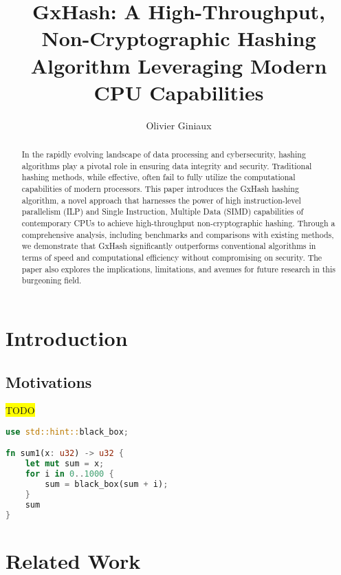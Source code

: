 \documentclass[11pt]{article}
\title{GxHash: A High-Throughput, Non-Cryptographic Hashing Algorithm Leveraging Modern CPU Capabilities}
\author{Olivier Giniaux}
\date{}
\begin{document}
\maketitle

\begin{abstract}

In the rapidly evolving landscape of data processing and cybersecurity, hashing algorithms play a pivotal role in ensuring data integrity and security. Traditional hashing methods, while effective, often fail to fully utilize the computational capabilities of modern processors. This paper introduces the GxHash hashing algorithm, a novel approach that harnesses the power of high instruction-level parallelism (ILP) and Single Instruction, Multiple Data (SIMD) capabilities of contemporary CPUs to achieve high-throughput non-cryptographic hashing. Through a comprehensive analysis, including benchmarks and comparisons with existing methods, we demonstrate that GxHash significantly outperforms conventional algorithms in terms of speed and computational efficiency without compromising on security. The paper also explores the implications, limitations, and avenues for future research in this burgeoning field.

\end{abstract}

\begin{multicols}{2}
\tableofcontents
\end{multicols}

\clearpage
\section{Introduction}

\subsection{Motivations}

\colorbox{yellow}{TODO}

\begin{lstlisting}[language=Rust, style=boxed]
use std::hint::black_box;

fn sum1(x: u32) -> u32 {
    let mut sum = x;
    for i in 0..1000 {
        sum = black_box(sum + i);
    }
    sum
}
\end{lstlisting}

\section{Related Work}
\end{document}
